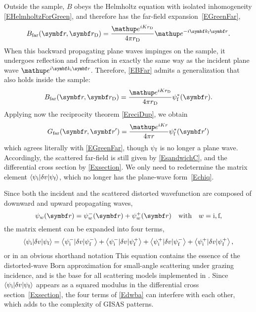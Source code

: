 Outside the sample,
$B$ obeys the Helmholtz equation
with isolated inhomogeneity \cref{EHelmholtzForGreen},
and therefore has the far-field expansion~\cref{EGreenFar},
%
\begin{equation}\label{EBFar}
  B_\text{far}(\r,\rD)
  =\frac{\e^{iKr_\text{D}}}{4\pi r_\text{D}}\e^{-i\k_\tf \r}.
\end{equation}
When this backward propagating plane waves impinges on the sample,
it undergoes reflection and refraction in exactly the same way as
the incident plane wave $\e^{i\k_\ti\r}$.
Therefore,
 \cref{EBFar} admits a generalization that also holds inside the sample:
\begin{equation}\label{EBFull}
  B_\text{far}(\r,\rD)
  = \frac{\e^{iKr_\text{D}}}{4\pi r_\text{D}}\psi^*_\tf(\r).
\end{equation}
Applying now the reciprocity theorem \cref{EreciDup},
we obtain
\begin{equation}\label{EGreenFarDWBA}
  G_\text{far}(\r,\r')
  = \frac{\e^{iKr}}{4\pi r}\psi^*_\tf(\r')
\end{equation}
which agrees literally with \cref{EGreenFar},
though $\psi_{\text{f}}$ is no longer a plane wave.
Accordingly,
the scattered far-field is still given by \cref{EsandwichC},
and the differential cross section by \cref{Exsection}.
We only need to redetermine the matrix element
$\left\langle \psi_{\text{i}}|\delta v|\psi_{\text{f}}\right\rangle$,
which no longer has the plane-wave form~\cref{Echiq}.

Since both the incident
and the scattered distorted wavefunction
are composed of downward and upward propagating waves,
\begin{equation}\label{Epsipm}
  \psi_w(\r)
  = \psi^-_w(\r) + \psi^+_w(\r)
  \quad\text{with}\quad
  w=\ti,\tf,
\end{equation}
%
the matrix element can be expanded into four terms,
\begin{equation}\label{Edwba4}
  \left\langle \psi_{\text{i}}|\delta v|\psi_{\text{f}}\right\rangle
  = \left\langle \psi^-_{\text{i}}|\delta v|\psi^-_{\text{f}}\right\rangle
  + \left\langle \psi^-_{\text{i}}|\delta v|\psi^+_{\text{f}}\right\rangle
  + \left\langle \psi^+_{\text{i}}|\delta v|\psi^-_{\text{f}}\right\rangle
  + \left\langle \psi^+_{\text{i}}|\delta v|\psi^+_{\text{f}}\right\rangle,
\end{equation}
%
%
or in an obvious shorthand notation
This equation contains the essence of
the distorted-wave Born approximation
for small-angle scattering under grazing incidence,
and is the base for all scattering models implemented in \BornAgain.
Since $\left\langle \psi_{\text{i}}|\delta v|\psi_{\text{f}}\right\rangle$
appears as a squared modulus
in the differential cross section~\cref{Exsection},
the four terms of \cref{Edwba} can interfere with each other,
which adds to the complexity of GISAS patterns.

